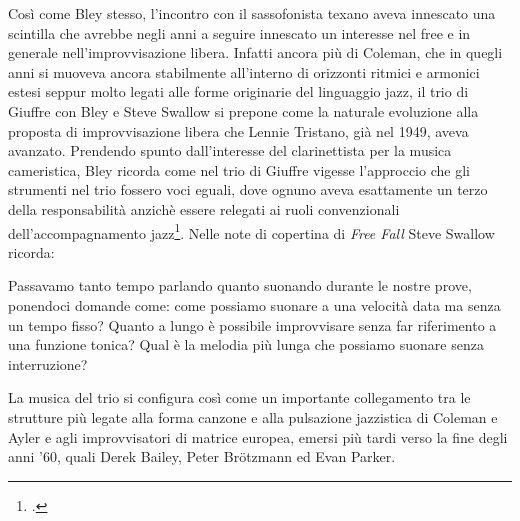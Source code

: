 Così come Bley stesso, l'incontro con il sassofonista texano aveva innescato una scintilla che avrebbe negli anni a seguire innescato un interesse nel free e in generale nell'improvvisazione libera. Infatti ancora più di Coleman, che in quegli anni si muoveva ancora stabilmente all'interno di orizzonti ritmici e armonici estesi seppur molto legati alle forme originarie del linguaggio jazz, il trio di Giuffre con Bley e Steve Swallow si prepone come la naturale evoluzione alla proposta di improvvisazione libera che Lennie Tristano, già nel 1949, aveva avanzato. Prendendo spunto dall'interesse del clarinettista per la musica cameristica, Bley ricorda come nel trio di Giuffre vigesse l'approccio che gli strumenti nel trio fossero voci eguali, dove ognuno aveva esattamente un terzo della responsabilità anzichè essere relegati ai ruoli convenzionali dell'accompagnamento jazz\footcite[389]{johnston}. Nelle note di copertina di \textit{Free Fall} Steve Swallow ricorda:
\begin{fquote}
	Passavamo tanto tempo parlando quanto suonando durante le nostre prove, ponendoci domande come: come possiamo suonare a una velocità data ma senza un tempo fisso? Quanto a lungo è possibile improvvisare senza far riferimento a una funzione tonica? Qual è la melodia più lunga che possiamo suonare senza interruzione?
\end{fquote}
La musica del trio si configura così come un importante collegamento tra le strutture più legate alla forma canzone e alla pulsazione jazzistica di Coleman e Ayler e agli improvvisatori di matrice europea, emersi più tardi verso la fine degli anni '60, quali Derek Bailey, Peter Brötzmann ed Evan Parker.\par
